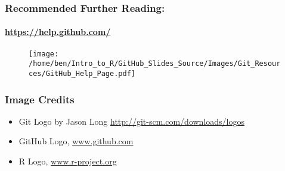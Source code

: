 \documentclass[xcolor=dvipsnames]{beamer}
\begin{document}
\begin{frame}
\frametitle{Recommended Further Reading:}
\framesubtitle{\url{https://help.github.com/}}
%
\begin{center}
\begin{figure}
\texttt{[image: /home/ben/Intro\_to\_R/GitHub\_Slides\_Source/Images/Git\_Resources/GitHub\_Help\_Page.pdf]}
\end{figure}

\end{center}

\end{frame}

\begin{frame}
\frametitle{Image Credits}
\begin{itemize}
\item Git Logo by Jason Long \url{http://git-scm.com/downloads/logos}
\item GitHub Logo, \url{www.github.com}
\item R Logo, \url{www.r-project.org}
\end{itemize}
\end{frame}
\end{document}

